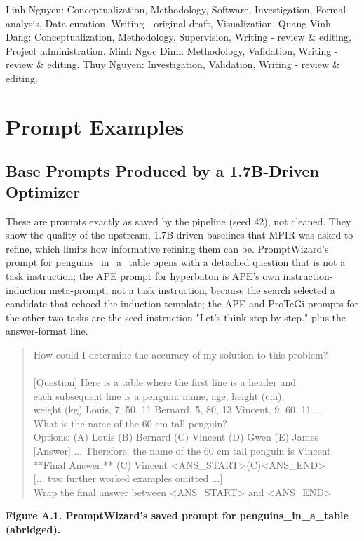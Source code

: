\documentclass{ieeeaccess}
\begin{document}
Linh Nguyen: Conceptualization, Methodology, Software, Investigation, Formal analysis, Data curation, Writing - original draft, Visualization. Quang-Vinh Dang: Conceptualization, Methodology, Supervision, Writing - review \& editing, Project administration. Minh Ngoc Dinh: Methodology, Validation, Writing - review \& editing. Thuy Nguyen: Investigation, Validation, Writing - review \& editing.

\appendices

\section{Prompt Examples}

\subsection{Base Prompts Produced by a 1.7B-Driven Optimizer}

These are prompts exactly as saved by the pipeline (seed 42), not cleaned. They show the quality of the upstream, 1.7B-driven baselines that MPIR was asked to refine, which limits how informative refining them can be. PromptWizard's prompt for penguins\_\allowbreak{}in\_\allowbreak{}a\_\allowbreak{}table opens with a detached question that is not a task instruction; the APE prompt for hyperbaton is APE's own instruction-induction meta-prompt, not a task instruction, because the search selected a candidate that echoed the induction template; the APE and ProTeGi prompts for the other two tasks are the seed instruction "Let's think step by step." plus the answer-format line.

\centering
\begin{quote}\ttfamily\small
How could I determine the accuracy of my solution to this problem?\\{}
~\\{}
[Question] Here is a table where the first line is a header and\\{}
each subsequent line is a penguin: name, age, height (cm),\\{}
weight (kg) Louis, 7, 50, 11 Bernard, 5, 80, 13 Vincent, 9, 60, 11 ...\\{}
What is the name of the 60 cm tall penguin?\\{}
Options: (A) Louis (B) Bernard (C) Vincent (D) Gwen (E) James\\{}
[Answer] ... Therefore, the name of the 60 cm tall penguin is Vincent.\\{}
**Final Answer:** (C) Vincent <ANS\_\allowbreak{}START>(C)<ANS\_\allowbreak{}END>\\{}
[... two further worked examples omitted ...]\\{}
Wrap the final answer between <ANS\_\allowbreak{}START> and <ANS\_\allowbreak{}END>\\{}
\end{quote}
\par\noindent\textbf{Figure A.1. PromptWizard's saved prompt for penguins\_\allowbreak{}in\_\allowbreak{}a\_\allowbreak{}table (abridged).}
\end{document}
